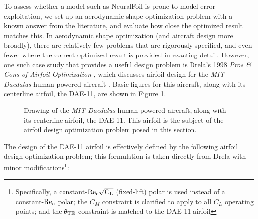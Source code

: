     To assess whether a model such as NeuralFoil is prone to model error exploitation, we set up an aerodynamic shape optimization problem with a known answer from the literature, and evaluate how close the optimized result matches this. In aerodynamic shape optimization (and aircraft design more broadly), there are relatively few problems that are rigorously specified, and even fewer where the correct optimized result is provided in exacting detail. However, one such case study that provides a useful design problem is Drela's 1998 \textit{Pros \& Cons of Airfoil Optimization} \cite{drela_pros_1998}, which discusses airfoil design for the \emph{MIT Daedalus} human-powered aircraft \cite{langford_feasibility_1986, langford_daedalus_1989, drela_humanpowered_1985}. Basic figures for this aircraft, along with its centerline airfoil, the DAE-11, are shown in Figure \ref{fig:daedalus_iso}.

    \begin{figure}[h]
        \centering
        
        \caption{Drawing of the \emph{MIT Daedalus} human-powered aircraft, along with its centerline airfoil, the DAE-11. This airfoil is the subject of the airfoil design optimization problem posed in this section.}
        \label{fig:daedalus_iso}
    \end{figure}

    The design of the DAE-11 airfoil is effectively defined by the following airfoil design optimization problem; this formulation is taken directly from Drela \cite{drela_pros_1998} with minor modifications\footnote{Specifically, a constant-$\rm Re_c \sqrt{C_L}$ (fixed-lift) polar is used instead of a constant-$\rm Re_c$ polar; the $C_M$ constraint is clarified to apply to all $C_L$ operating points; and the $\theta_{\rm TE}$ constraint is matched to the DAE-11 airfoil}:

